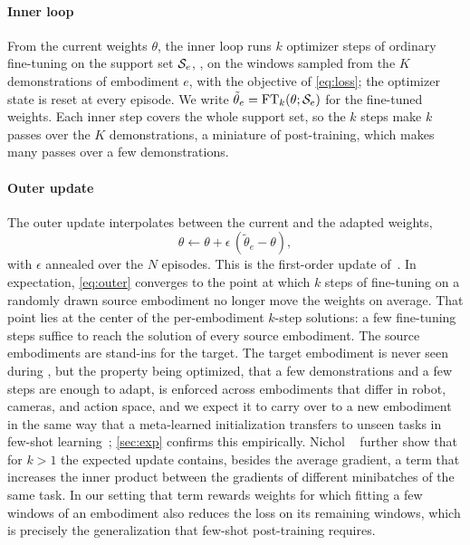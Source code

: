 \paragraph{Inner loop}
From the current weights $\theta$, the inner loop runs $k$ optimizer steps of ordinary fine-tuning on the support set $\mathcal{S}_e$, \ie, on the windows sampled from the $K$ demonstrations of embodiment $e$, with the objective of \cref{eq:loss}; the optimizer state is reset at every episode.
We write $\tilde\theta_e=\mathrm{FT}_k(\theta;\mathcal{S}_e)$ for the fine-tuned weights.
Each inner step covers the whole support set, so the $k$ steps make $k$ passes over the $K$ demonstrations, a miniature of post-training, which makes many passes over a few demonstrations.

\paragraph{Outer update}
The outer update interpolates between the current and the adapted weights,
\begin{equation}
  \theta\leftarrow\theta+\epsilon\,(\tilde\theta_e-\theta),
  \label{eq:outer}
\end{equation}
with $\epsilon$ annealed over the $N$ episodes.
This is the first-order update of~\cite{nichol2018reptile}.
In expectation, \cref{eq:outer} converges to the point at which $k$ steps of fine-tuning on a randomly drawn source embodiment no longer move the weights on average.
That point lies at the center of the per-embodiment $k$-step solutions: a few fine-tuning steps suffice to reach the solution of every source embodiment.
The source embodiments are stand-ins for the target.
The target embodiment is never seen during \method, but the property being optimized, that a few demonstrations and a few steps are enough to adapt, is enforced across embodiments that differ in robot, cameras, and action space, and we expect it to carry over to a new embodiment in the same way that a meta-learned initialization transfers to unseen tasks in few-shot learning~\cite{finn2017maml,nichol2018reptile}; \cref{sec:exp} confirms this empirically.
Nichol \etal~\cite{nichol2018reptile} further show that for $k>1$ the expected update contains, besides the average gradient, a term that increases the inner product between the gradients of different minibatches of the same task.
In our setting that term rewards weights for which fitting a few windows of an embodiment also reduces the loss on its remaining windows, which is precisely the generalization that few-shot post-training requires.

